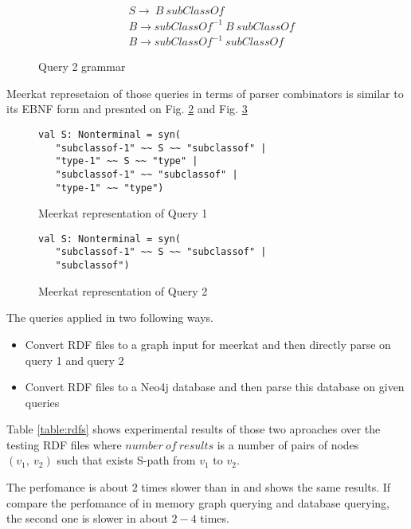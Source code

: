 \begin{figure}[h]
\begin{align*}
& S \rightarrow\ B\ subClassOf\\
& B \rightarrow subClassOf^{-1}\ B\ subClassOf\\
& B \rightarrow subClassOf^{-1}\ subClassOf
\end{align*}
\caption{Query 2 grammar}
\label{fig:query2}
\end{figure}

Meerkat represetaion of those queries in terms of parser combinators is similar to its EBNF form and presnted on Fig. \ref{fig:query1Meerkat} and Fig. \ref{fig:query2Meerkat}

\begin{figure}[h]
\begin{lstlisting}
val S: Nonterminal = syn(
   "subclassof-1" ~~ S ~~ "subclassof" |
   "type-1" ~~ S ~~ "type" |
   "subclassof-1" ~~ "subclassof" |
   "type-1" ~~ "type")
\end{lstlisting}
\caption{Meerkat representation of Query 1}
\label{fig:query1Meerkat}
\end{figure}

\begin{figure}[h]
\begin{lstlisting}
val S: Nonterminal = syn(
   "subclassof-1" ~~ S ~~ "subclassof" |
   "subclassof")
\end{lstlisting}
\caption{Meerkat representation of Query 2}
\label{fig:query2Meerkat}
\end{figure}

The queries applied in two following ways.
\begin{itemize}
    \item Convert RDF files to a graph input for meerkat and then directly parse on query 1 and query 2
    \item Convert RDF files to a Neo4j database and then parse this database on given queries
\end{itemize} 
Table \ref{table:rdfs} shows experimental results of those two aproaches over the testing RDF files where $number\ of\ results$ is a number of pairs of nodes $(v_1,\ v_2)$ such that exists S-path from $v_1$ to $v_2$.

The perfomance is about $2$ times slower than in \cite{GrigorevR16} and shows the same results. If compare the perfomance of in memory graph querying and database querying, the second one is slower in about $2-4$ times.






